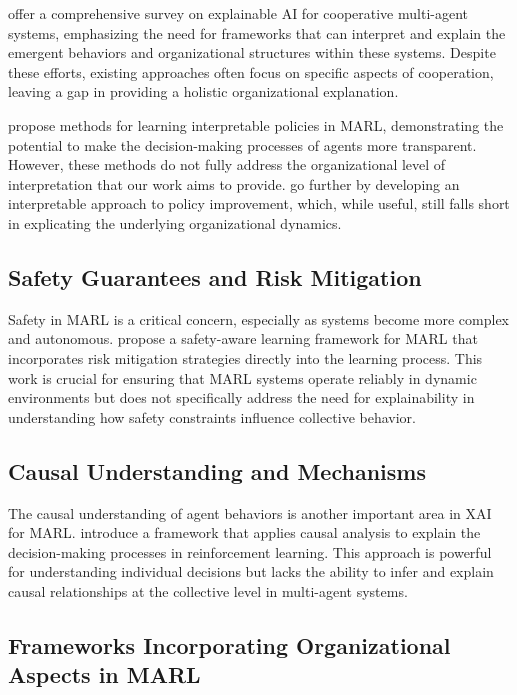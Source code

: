 \documentclass[sn-mathphys-num]{sn-jnl}%
\theoremstyle{thmstyleone}%
\theoremstyle{thmstyletwo}%
\theoremstyle{thmstylethree}%
\begin{document}
\cite{li2020survey} offer a comprehensive survey on explainable AI for cooperative multi-agent systems, emphasizing the need for frameworks that can interpret and explain the emergent behaviors and organizational structures within these systems. Despite these efforts, existing approaches often focus on specific aspects of cooperation, leaving a gap in providing a holistic organizational explanation.

\cite{raileanu2018interpretable} propose methods for learning interpretable policies in MARL, demonstrating the potential to make the decision-making processes of agents more transparent. However, these methods do not fully address the organizational level of interpretation that our work aims to provide. \cite{saunders2018learning} go further by developing an interpretable approach to policy improvement, which, while useful, still falls short in explicating the underlying organizational dynamics.

\subsection{Safety Guarantees and Risk Mitigation}

Safety in MARL is a critical concern, especially as systems become more complex and autonomous. \cite{alshiekh2018safety} propose a safety-aware learning framework for MARL that incorporates risk mitigation strategies directly into the learning process. This work is crucial for ensuring that MARL systems operate reliably in dynamic environments but does not specifically address the need for explainability in understanding how safety constraints influence collective behavior.

\subsection{Causal Understanding and Mechanisms}

The causal understanding of agent behaviors is another important area in XAI for MARL. \cite{armstrong2020causal} introduce a framework that applies causal analysis to explain the decision-making processes in reinforcement learning. This approach is powerful for understanding individual decisions but lacks the ability to infer and explain causal relationships at the collective level in multi-agent systems.

\subsection{Frameworks Incorporating Organizational Aspects in MARL}
\end{document}
